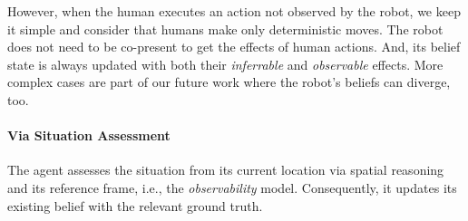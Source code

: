 \documentclass[letterpaper]{article} %
\begin{document}


However, when the human executes an action not observed by the robot, we keep it simple and consider that humans make only deterministic moves. The robot does not need to be co-present to get the effects of human actions. And, its belief state is always updated with both their \textit{inferrable} and \textit{observable} effects. More complex cases are part of our future work where the robot's beliefs can diverge, too. 

\paragraph{Via Situation Assessment}

The agent assesses the situation from its current location via spatial reasoning and its reference frame, i.e., the \textit{observability} model. Consequently, it updates its existing belief with the relevant ground truth. 
\end{document}
